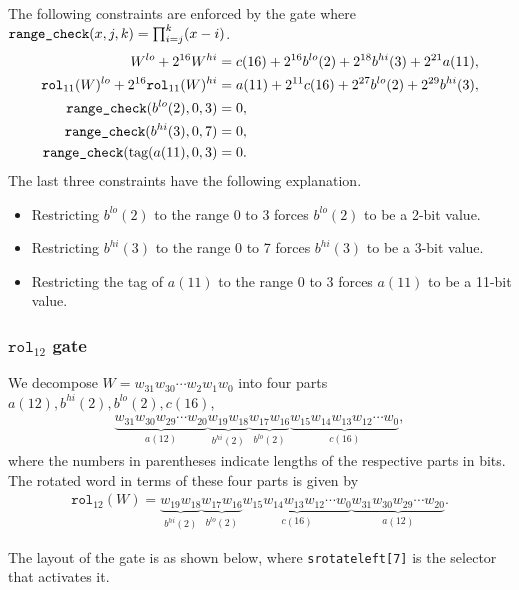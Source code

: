 \documentclass[10pt]{article}
\begin{document}
The following constraints are enforced by the gate where $\texttt{range\textunderscore check}(x, j, k) = \prod_{i=j}^k (x-i)$.
\begin{align*}
  W^{lo} + 2^{16} W^{hi} & = c(16) + 2^{16} b^{lo}(2) + 2^{18} b^{hi}(3) + 2^{21} a(11),\\
  \texttt{rol}_{11}(W)^{lo} + 2^{16} \texttt{rol}_{11}(W)^{hi} & = a(11) + 2^{11} c(16) + 2^{27} b^{lo}(2) + 2^{29} b^{hi}(3),\\
  \texttt{range\textunderscore check}(b^{lo}(2), 0, 3) & = 0,\\
  \texttt{range\textunderscore check}(b^{hi}(3), 0, 7) & = 0,\\
  \texttt{range\textunderscore check}(\text{tag}(a(11), 0, 3) & = 0.
\end{align*}
The last three constraints have the following explanation.
\begin{itemize}
\item Restricting $b^{lo}(2)$ to the range 0 to 3 forces $b^{lo}(2)$ to be a 2-bit value.
\item Restricting $b^{hi}(3)$ to the range 0 to 7 forces $b^{hi}(3)$ to be a 3-bit value.
\item Restricting the tag of $a(11)$ to the range 0 to 3 forces $a(11)$ to be a 11-bit value.
\end{itemize}


\subsubsection{$\texttt{rol}_{12}$ gate}%
\label{sec:rol_12_gate}
We decompose $W = w_{31}w_{30}\cdots w_2w_1w_0$ into four parts $a(12), b^{hi}(2), b^{lo}(2), c(16)$,
\begin{align*}
  \underbrace{w_{31}w_{30}w_{29}\cdots w_{20}}_{a(12)} \underbrace{w_{19}w_{18}}_{b^{hi}(2)}
  \underbrace{w_{17} w_{16}}_{b^{lo}(2)} \underbrace{w_{15}w_{14}w_{13}w_{12}\cdots w_{0}}_{c(16)},
\end{align*}
where the numbers in parentheses indicate lengths of the respective parts in bits. The rotated word in terms of these four parts is given by
\begin{align*}
  \texttt{rol}_{12}(W) = 
  \underbrace{w_{19} w_{18}}_{b^{hi}(2)} \underbrace{w_{17} w_{16}}_{b^{lo}(2)}
  \underbrace{w_{15}w_{14}w_{13}w_{12}\cdots w_{0}}_{c(16)}\underbrace{w_{31}w_{30}w_{29}\cdots w_{20}}_{a(12)}.
\end{align*}

The layout of the gate is as shown below, where \texttt{s\textunderscore rotate\textunderscore left[7]} is the selector that activates it.
\end{document}
